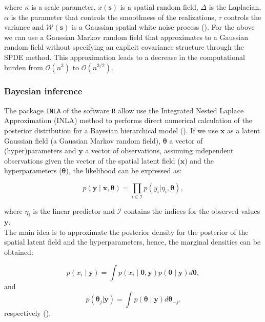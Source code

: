 \documentclass{article}
\begin{document}
where $\kappa$ is a scale parameter, $x(\boldsymbol{s})$ is a spatial random field, $\Delta$ is the Laplacian, $\alpha$ is the parameter that controls the smoothness of the realizations, $\tau$ controls the variance and $\boldsymbol{\mathcal{W}(s)}$  is a Gaussian spatial white noise process (\cite{lindgren2015bayesian}). For the above we can use a Gaussian Markov random field that approximates to a Gaussian random field without specifying an explicit covariance structure through the SPDE method. This approximation leads to a decrease in the computational burden from $\mathcal{O}(n^{3})$ to $\mathcal{O}(n^{3/2})$. 


\subsubsection{Bayesian inference}

 The package \texttt{INLA} of the software \texttt{R} allow use the Integrated Nested Laplace Approximation (INLA) method to performs direct numerical calculation of the posterior distribution for a Bayesian hierarchical model (\cite{rue2009approximate}\cite{martino2009implementing}). If we use $\boldsymbol{x}$ as a latent Gaussian field (a Gaussian Markov random field), $\boldsymbol{\theta}$ a vector of (hyper)parameters and $\boldsymbol{y}$ a vector of observations, assuming independent observations given the vector of the spatial latent field ($\boldsymbol{x}$) and the hyperparameters ($\boldsymbol{\theta}$), the likelihood can be expressed as:

\begin{equation} \label{eqn:eq2}
p(\boldsymbol{y}\mid \boldsymbol{x},\boldsymbol{\theta}) =\prod_{i\in \mathcal{I}} p(y_i|\eta_i,\boldsymbol{\theta}),
\end{equation}

where $\eta_{i}$ is the linear predictor and $\mathcal{I}$ contains the indices for the observed values $\boldsymbol{y}$.  \\

The main idea is to approximate the posterior density for the posterior of the spatial latent field and the hyperparameters, hence, the marginal densities can be obtained:

\begin{equation} \label{eqn:eq3}
p(x_i \mid \boldsymbol{y}) = \int p(x_i \mid \boldsymbol{\theta},\boldsymbol{y})  p(\boldsymbol{\theta} \mid \boldsymbol{y}) d\boldsymbol{\theta},
\end{equation}
and
\begin{equation} \label{eqn:eq4}
p(\boldsymbol{\theta}_j|\boldsymbol{y}) = \int p(\boldsymbol{\theta} \mid \boldsymbol{y})  d\boldsymbol{\theta}_{-j}.
\end{equation}
respectively (\cite{lindgren2015bayesian}\cite{krainski2018advanced}). \\
\end{document}
